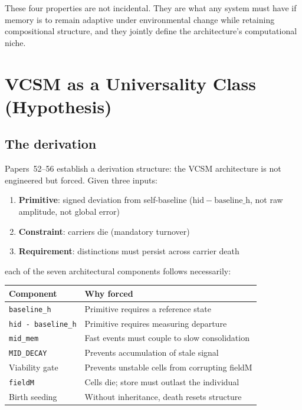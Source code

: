 \documentclass[11pt]{article}
\begin{document}
These four properties are not incidental.
They are what any system must have if memory is to remain adaptive under environmental
change while retaining compositional structure, and they jointly define the architecture's
computational niche.

\section{VCSM as a Universality Class (Hypothesis)}

\subsection{The derivation}

Papers~52--56 establish a derivation structure: the VCSM architecture is not
engineered but forced. Given three inputs:
\begin{enumerate}
  \item \textbf{Primitive}: signed deviation from self-baseline
    ($\mathrm{hid} - \mathrm{baseline\_h}$, not raw amplitude, not global error)
  \item \textbf{Constraint}: carriers die (mandatory turnover)
  \item \textbf{Requirement}: distinctions must persist across carrier death
\end{enumerate}
each of the seven architectural components follows necessarily:

\begin{center}
\begin{tabular}{ll}
\toprule
Component & Why forced \\
\midrule
\texttt{baseline\_h}        & Primitive requires a reference state \\
\texttt{hid - baseline\_h}  & Primitive requires measuring departure \\
\texttt{mid\_mem}           & Fast events must couple to slow consolidation \\
\texttt{MID\_DECAY}         & Prevents accumulation of stale signal \\
Viability gate              & Prevents unstable cells from corrupting fieldM \\
\texttt{fieldM}             & Cells die; store must outlast the individual \\
Birth seeding               & Without inheritance, death resets structure \\
\bottomrule
\end{tabular}
\end{center}
\end{document}
